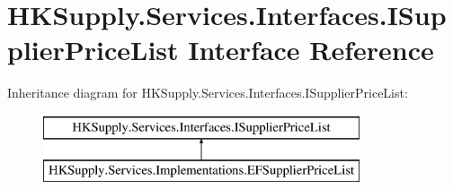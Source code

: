 \hypertarget{interface_h_k_supply_1_1_services_1_1_interfaces_1_1_i_supplier_price_list}{}\section{H\+K\+Supply.\+Services.\+Interfaces.\+I\+Supplier\+Price\+List Interface Reference}
\label{interface_h_k_supply_1_1_services_1_1_interfaces_1_1_i_supplier_price_list}
Inheritance diagram for H\+K\+Supply.\+Services.\+Interfaces.\+I\+Supplier\+Price\+List\+:\begin{figure}[H]
\begin{center}
\leavevmode
\includegraphics[height=2.000000cm]{interface_h_k_supply_1_1_services_1_1_interfaces_1_1_i_supplier_price_list}
\end{center}
\end{figure}
